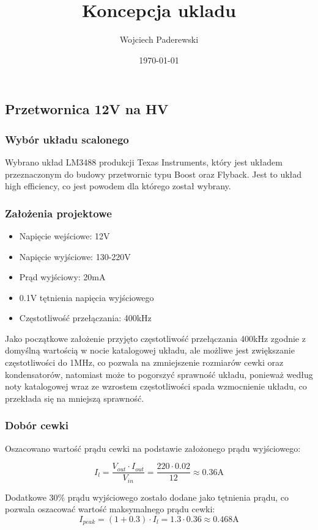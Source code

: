\documentclass[../../main.tex]{subfiles}
\author{Wojciech Paderewski}
\date{\today}
\title{Koncepcja ukladu}
\begin{document}
\subsection{Przetwornica 12V na HV}
\subsubsection{Wybór układu scalonego}
Wybrano układ LM3488 produkcji Texas Instruments, który jest układem przeznaczonym do budowy przetwornic typu Boost oraz Flyback. 
Jest to układ high efficiency, co jest powodem dla którego został wybrany.

\subsubsection{Założenia projektowe}
\begin{itemize}
    \item Napięcie wejściowe: 12\si{\volt}
    \item Napięcie wyjściowe: 130-220\si{\volt}
    \item Prąd wyjściowy: 20\si{\milli\ampere}
    \item 0.1\si{\volt} tętnienia napięcia wyjściowego
    \item Częstotliwość przełączania: 400\si{\kilo\hertz}
\end{itemize}

Jako początkowe założenie przyjęto częstotliwość przełączania 400kHz zgodnie z domyślną wartością w nocie katalogowej układu, 
ale możliwe jest zwiększanie częstotliwości do 1MHz, co pozwala na zmniejszenie rozmiarów cewki oraz kondensatorów, natomiast może to
pogorszyć sprawność układu, ponieważ według noty katalogowej wraz ze wzrostem częstotliwości spada wzmocnienie układu, co przekłada się na mniejszą sprawność.

\subsubsection{Dobór cewki}
Oszacowano wartość prądu cewki na podstawie założonego prądu wyjściowego:

\begin{equation}
    I_{l} = \frac{V_{out} \cdot I_{out}}{V_{in}} = \frac{220 \cdot 0.02}{12} \approx 0.36\si{\ampere}
\end{equation}

Dodatkowe 30\% prądu wyjściowego zostało dodane jako tętnienia prądu, co pozwala oszacować wartość maksymalnego prądu cewki:
\begin{equation}
    I_{peak} = (1+0.3) \cdot I_{l} = 1.3 \cdot 0.36 \approx 0.468\si{\ampere}
\end{equation}
\end{document}
